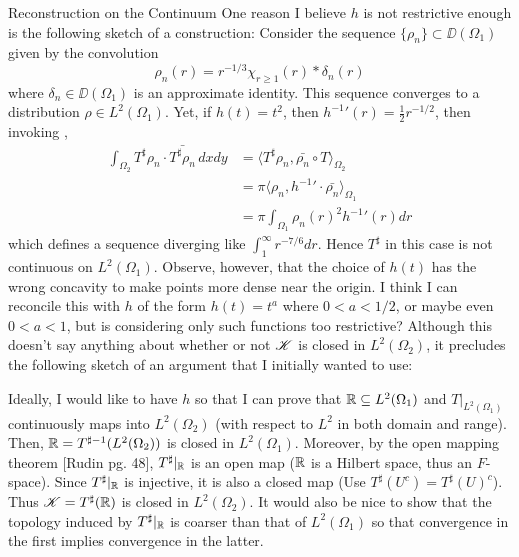 \begin{chapter}{Reconstruction on the Continuum}
One reason I believe $h$ is not restrictive enough is %
the following sketch of a construction:
Consider the sequence $\{\rho_n\}\subset \DD(\Omega_1)$ given by the convolution
\begin{equation}
  \rho_n(r) = r^{-1/3}\chi_{r\ge1}(r) * \delta_n(r)
\end{equation}
where $\delta_n \in \DD(\Omega_1)$ is an approximate identity.
This sequence converges to a distribution $\rho \in L^2(\Omega_1)$.
Yet, if $h(t) = t^2$, then ${h^{-1}}'(r) = \frac 12 r^{-1/2}$, then invoking ,
\begin{align}
  \int_{\Omega_2} T^\sharp \rho_n \cdot \bar{T^\sharp \rho_n}\,dxdy
  &= \Big\langle T^\sharp \rho_n, \bar{\rho_n} \circ T\Big\rangle_{\Omega_2}\\
  &= \pi\Big\langle \rho_n, {h^{-1}}'\cdot \bar{\rho_n} \Big\rangle_{\Omega_1}\\
  &= \pi\int_{\Omega_1} \rho_n(r)^2 {h^{-1}}'(r) dr
\end{align}
which defines a sequence diverging like $\int_1^\infty r^{-7/6} dr$. 
Hence $T^\sharp$ in this case is not continuous on $L^2(\Omega_1)$.
Observe, however, that the choice of $h(t)$ has the wrong concavity to make points more dense near the origin.  
I think I can reconcile this with $h$ of the form $h(t) = t^{a}$ where $0<a<1/2$, or maybe even $0<a<1$, but is considering only such functions too restrictive?
Although this doesn't say anything about whether or not $\mathscr K$ is closed in $L^2(\Omega_2)$, it precludes the following sketch of an argument that I initially wanted to use:

Ideally, I would like to have $h$ so that I can prove that $\mathbb R \subseteq L^2(\Omega_1)$ and $T|_{L^2(\Omega_1)}$ continuously maps into $L^2(\Omega_2)$ (with respect to $L^2$ in both domain and range). 
Then, $\mathbb R = T^{\sharp-1}(L^2(\Omega_2))$ is closed in $L^2(\Omega_1)$.  
Moreover, by the open mapping theorem [Rudin pg. 48], $T^\sharp|_{\mathbb R}$ is an open map ($\mathbb R$ is a Hilbert space, thus an $F$-space).  Since $T^\sharp|_{\mathbb R}$ is injective, it is also a closed map (Use $T^\sharp(U^c) = T^\sharp(U)^c$). Thus $\mathscr K = T^\sharp(\mathbb R)$ is closed in $L^2(\Omega_2)$.  
It would also be nice to show that the topology induced by $T^\sharp|_{\mathbb R}$ is coarser than that of $L^2(\Omega_1)$ so that convergence in the first implies convergence in the latter.


\end{chapter}

